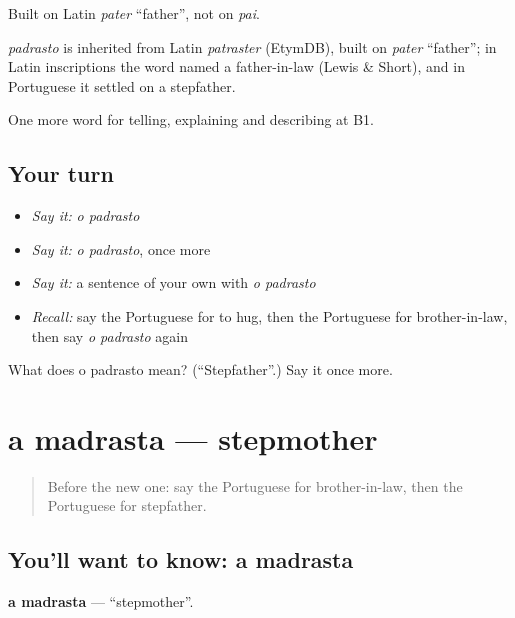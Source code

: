 Built on Latin \emph{pater} \textquotedblleft{}father\textquotedblright{}, not on \emph{pai}.

\begin{cousinweb}
\emph{padrasto} is inherited from Latin \emph{patraster} (EtymDB), built on \emph{pater} \textquotedblleft{}father\textquotedblright{}; in Latin inscriptions the word named a father-in-law (Lewis \& Short), and in Portuguese it settled on a stepfather.
\end{cousinweb}

\begin{grammarlens}[title={What you've built}]
One more word for telling, explaining and describing at B1.
\end{grammarlens}

\subsection*{Your turn}
\begin{itemize}
\raggedright
  \item \emph{Say it:} \emph{o padrasto}
  \item \emph{Say it:} \emph{o padrasto}, once more
  \item \emph{Say it:} a sentence of your own with \emph{o padrasto}
  \item \emph{Recall:} say the Portuguese for to hug, then the Portuguese for brother-in-law, then say \emph{o padrasto} again
\end{itemize}

\begin{tcolorbox}[breakable,colback=teal!4,colframe=teal!35!black,title={Before you move on}]
What does o padrasto mean? (\textquotedblleft{}Stepfather\textquotedblright{}.) Say it once more.
\end{tcolorbox}
\section[a madrasta]{a madrasta — stepmother}

\label{lesson:PT-C492-madrasta}



\begin{quote}
Before the new one: say the Portuguese for brother-in-law, then the Portuguese for stepfather.
\end{quote}

\subsection*{You'll want to know: a madrasta}
\textbf{a madrasta} — \textquotedblleft{}stepmother\textquotedblright{}.

